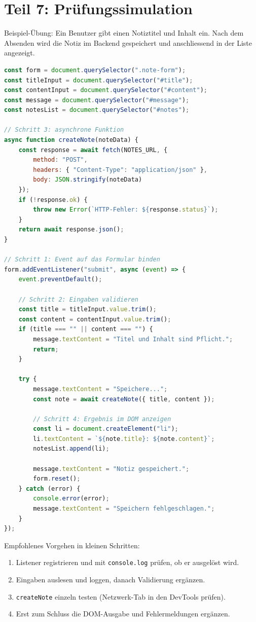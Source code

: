 \documentclass[a4paper,12pt]{article}
\begin{document}
\section{Teil 7: Prüfungssimulation}

Beispiel-Übung: Ein Benutzer gibt einen Notiztitel und Inhalt ein. Nach dem Absenden wird die Notiz im Backend gespeichert und anschliessend in der Liste angezeigt.

\begin{lstlisting}[language=JavaScript]
const form = document.querySelector(".note-form");
const titleInput = document.querySelector("#title");
const contentInput = document.querySelector("#content");
const message = document.querySelector("#message");
const notesList = document.querySelector("#notes");

// Schritt 3: asynchrone Funktion
async function createNote(noteData) {
    const response = await fetch(NOTES_URL, {
        method: "POST",
        headers: { "Content-Type": "application/json" },
        body: JSON.stringify(noteData)
    });
    if (!response.ok) {
        throw new Error(`HTTP-Fehler: ${response.status}`);
    }
    return await response.json();
}

// Schritt 1: Event auf das Formular binden
form.addEventListener("submit", async (event) => {
    event.preventDefault();

    // Schritt 2: Eingaben validieren
    const title = titleInput.value.trim();
    const content = contentInput.value.trim();
    if (title === "" || content === "") {
        message.textContent = "Titel und Inhalt sind Pflicht.";
        return;
    }

    try {
        message.textContent = "Speichere...";
        const note = await createNote({ title, content });

        // Schritt 4: Ergebnis im DOM anzeigen
        const li = document.createElement("li");
        li.textContent = `${note.title}: ${note.content}`;
        notesList.append(li);

        message.textContent = "Notiz gespeichert.";
        form.reset();
    } catch (error) {
        console.error(error);
        message.textContent = "Speichern fehlgeschlagen.";
    }
});
\end{lstlisting}

Empfohlenes Vorgehen in kleinen Schritten:
\begin{enumerate}
    \item Listener registrieren und mit \texttt{console.log} prüfen, ob er ausgelöst wird.
    \item Eingaben auslesen und loggen, danach Validierung ergänzen.
    \item \texttt{createNote} einzeln testen (Netzwerk-Tab in den DevTools prüfen).
    \item Erst zum Schluss die DOM-Ausgabe und Fehlermeldungen ergänzen.
\end{enumerate}
\end{document}

